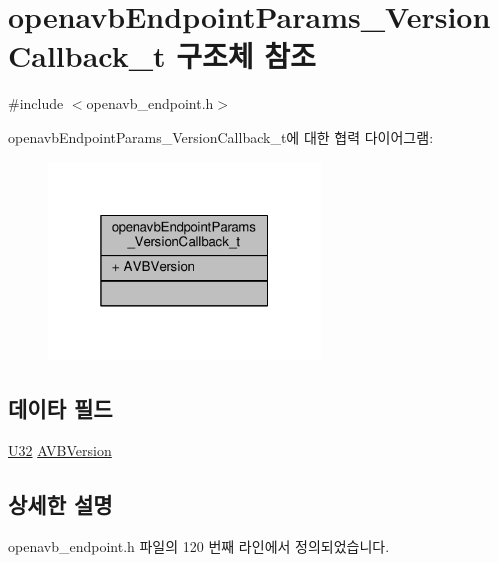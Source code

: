 \hypertarget{structopenavb_endpoint_params___version_callback__t}{}\section{openavb\+Endpoint\+Params\+\_\+\+Version\+Callback\+\_\+t 구조체 참조}
\label{structopenavb_endpoint_params___version_callback__t}


{\ttfamily \#include $<$openavb\+\_\+endpoint.\+h$>$}



openavb\+Endpoint\+Params\+\_\+\+Version\+Callback\+\_\+t에 대한 협력 다이어그램\+:
\nopagebreak
\begin{figure}[H]
\begin{center}
\leavevmode
\includegraphics[width=205pt]{structopenavb_endpoint_params___version_callback__t__coll__graph}
\end{center}
\end{figure}
\subsection*{데이타 필드}
\begin{DoxyCompactItemize}
\item 
\hyperlink{openavb__types__base__pub_8h_a696390429f2f3b644bde8d0322a24124}{U32} \hyperlink{structopenavb_endpoint_params___version_callback__t_ae20e1375c7e5bfda67ee623a7ff192b4}{A\+V\+B\+Version}
\end{DoxyCompactItemize}


\subsection{상세한 설명}


openavb\+\_\+endpoint.\+h 파일의 120 번째 라인에서 정의되었습니다.



